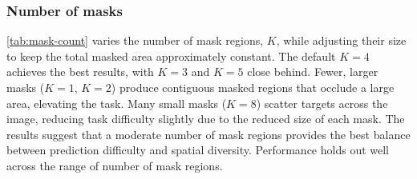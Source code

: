 \subsubsection{Number of masks}

\cref{tab:mask-count} varies the number of mask regions, $K$, while adjusting their size to keep the total masked area approximately constant.
The default $K{=}4$ achieves the best results, with $K{=}3$ and $K{=}5$ close behind.
Fewer, larger masks ($K{=}1$, $K{=}2$) produce contiguous masked regions that occlude a large area, elevating the task.
Many small masks ($K{=}8$) scatter targets across the image, reducing task difficulty slightly due to the reduced size of each mask.
The results suggest that a moderate number of mask regions provides the best balance between prediction difficulty and spatial diversity.
Performance holds out well across the range of number of mask regions.

\begin{table}[tbh]
\centering
\caption{Effect of changing the number of mask regions, $K$. The mask scale is adjusted to keep the seen fraction of the image approximately constant. The mask scale percentage is relative to the default ($K{=}4$). ViT-S, 300 ep. on IN-1k.}
\label{tab:mask-count}
\small
{}
\end{table}


